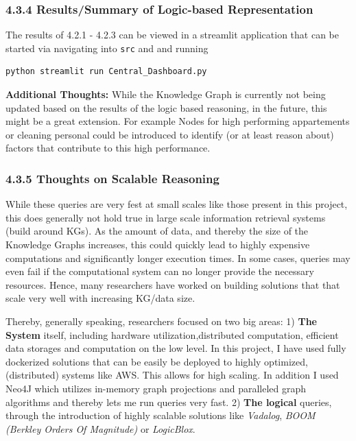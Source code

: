 \documentclass[
]{article}
\begin{document}
\subsubsection{4.3.4 Results/Summary of Logic-based
Representation}\label{resultssummary-of-logic-based-representation}

The results of 4.2.1 - 4.2.3 can be viewed in a streamlit application
that can be started via navigating into \texttt{src} and and running

\begin{verbatim}
python streamlit run Central_Dashboard.py
\end{verbatim}

\textbf{Additional Thoughts:} While the Knowledge Graph is currently not
being updated based on the results of the logic based reasoning, in the
future, this might be a great extension. For example Nodes for high
performing appartements or cleaning personal could be introduced to
identify (or at least reason about) factors that contribute to this high
performance.

\subsubsection{4.3.5 Thoughts on Scalable
Reasoning}\label{thoughts-on-scalable-reasoning}

While these queries are very fest at small scales like those present in
this project, this does generally not hold true in large scale
information retrieval systems (build around KGs). As the amount of data,
and thereby the size of the Knowledge Graphs increases, this could
quickly lead to highly expensive computations and significantly longer
execution times. In some cases, queries may even fail if the
computational system can no longer provide the necessary resources.
Hence, many researchers have worked on building solutions that that
scale very well with increasing KG/data size.

Thereby, generally speaking, researchers focused on two big areas: 1)
\textbf{The System} itself, including hardware utilization,distributed
computation, efficient data storages and computation on the low level.
In this project, I have used fully dockerized solutions that can be
easily be deployed to highly optimized, (distributed) systems like AWS.
This allows for high scaling. In addition I used Neo4J which utilizes
in-memory graph projections and paralleled graph algorithms and thereby
lets me run queries very fast. 2) \textbf{The logical} queries, through
the introduction of highly scalable solutions like \emph{Vadalog},
\emph{BOOM (Berkley Orders Of Magnitude)} or \emph{LogicBlox}.
\end{document}
